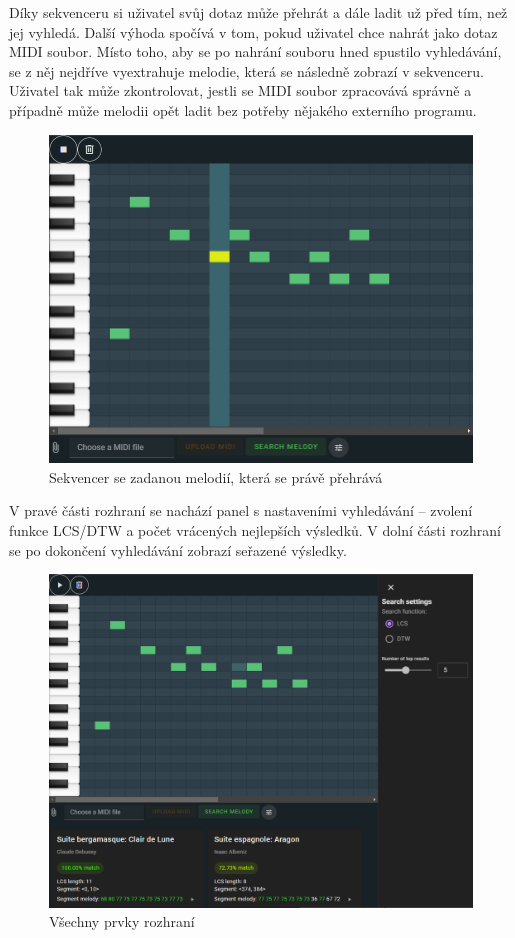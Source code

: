 Díky sekvenceru si uživatel svůj dotaz může přehrát a dále ladit už před tím, než jej vyhledá. Další výhoda spočívá v tom, pokud uživatel chce nahrát jako dotaz MIDI soubor. Místo toho, aby se po nahrání souboru hned spustilo vyhledávání, se z něj nejdříve vyextrahuje melodie, která se následně zobrazí v sekvenceru. Uživatel tak může zkontrolovat, jestli se MIDI soubor zpracovává správně a případně může melodii opět ladit bez potřeby nějakého externího programu.

\begin{figure}[!ht]
    \centering
    \caption{Sekvencer se zadanou melodií, která se právě přehrává}
    \includegraphics[width=\textwidth]{images/seq_playing.png}
\end{figure}

V pravé části rozhraní se nachází panel s nastaveními vyhledávání -- zvolení funkce LCS/DTW a počet vrácených nejlepších výsledků. V dolní části rozhraní se po dokončení vyhledávání zobrazí seřazené výsledky.

\begin{figure}
    \centering
    \caption{Všechny prvky rozhraní}
    \includegraphics[width=\textwidth]{images/interface.png}
\end{figure}